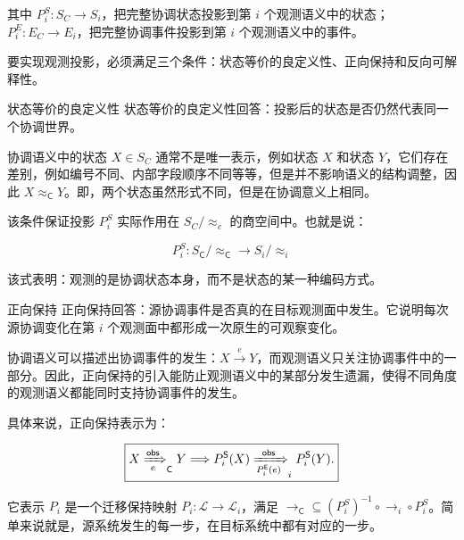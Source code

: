 其中 $P_i^{S}: S_{C} \rightarrow S_{i}$，把完整协调状态投影到第 $i$ 个观测语义中的状态；$P_i^{E}: E_{C} \rightarrow E_{i}$，把完整协调事件投影到第 $i$ 个观测语义中的事件。

要实现观测投影，必须满足三个条件：状态等价的良定义性、正向保持和反向可解释性。

\begin{MWCallout}[MWCyan]{状态等价的良定义性}
  状态等价的良定义性回答：投影后的状态是否仍然代表同一个协调世界。

  协调语义中的状态 $X \in S_{C}$ 通常不是唯一表示，例如状态 $X$ 和状态 $Y$，它们存在差别，例如编号不同、内部字段顺序不同等等，但是并不影响语义的结构调整，因此 $X\approx_{\mathsf C}Y$。即，两个状态虽然形式不同，但是在协调意义上相同。

  该条件保证投影 $P_{i}^{S}$ 实际作用在 $S_{C} / \approx_{c}$ 的商空间中。也就是说：

  \begin{equation}
    \boxed{ P_i^S: S_{\mathsf C}/\approx_{\mathsf C} \rightarrow S_i/\approx_i}
    \label{eq:projection-on-state-quotients}
  \end{equation}

  该式表明：观测的是协调状态本身，而不是状态的某一种编码方式。
\end{MWCallout}

\begin{MWCallout}[MWCyan]{正向保持}
  正向保持回答：源协调事件是否真的在目标观测面中发生。它说明每次源协调变化在第 $i$ 个观测面中都形成一次原生的可观察变化。

  协调语义可以描述出协调事件的发生：$X \xrightarrow e Y$，而观测语义只关注协调事件中的一部分。因此，正向保持的引入能防止观测语义中的某部分发生遗漏，使得不同角度的观测语义都能同时支持协调事件的发生。

  具体来说，正向保持表示为：

  \begin{equation}
    \boxed{X\xRightarrow[e]{\mathsf{obs}}_{\mathsf C}Y
      \Longrightarrow P_i^{\mathsf S}(X)
      \xRightarrow[P_i^{\mathsf E}(e)]{\mathsf{obs}}_i
    P_i^{\mathsf S}(Y).}
    \label{eq:projection-forward-preservation}
  \end{equation}

  它表示 $P_{i}$ 是一个迁移保持映射 $P_{i}: \mathcal{L} \rightarrow \mathcal{L}_{i}$，满足 $\rightarrow_{\mathsf C} \subseteq (P_i^S)^{-1} \circ \rightarrow_i \circ P_i^S$。简单来说就是，源系统发生的每一步，在目标系统中都有对应的一步。
\end{MWCallout}

